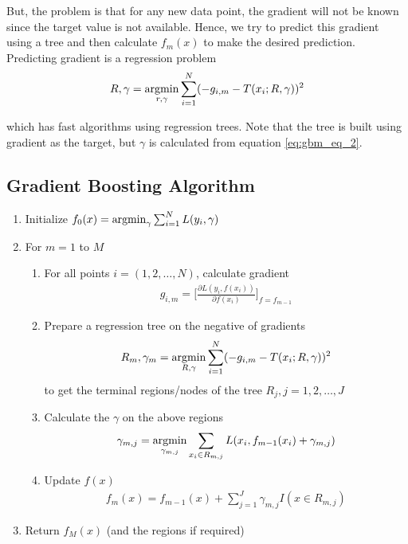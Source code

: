 \documentclass[../statistical_learning_notes.tex]{subfiles}
\begin{document}
But, the problem is that for any new data point, the gradient will not be known since the target value is not available. Hence, we try to predict this gradient using a tree and then calculate $f_{m}(x)$ to make the desired prediction. Predicting gradient is a regression problem
\begin{align*}
    R, \gamma = \operatorname*{argmin}_{r, \gamma} \sum_{i=1}^{N} (-g_{i,m} - T(x_{i}; R, \gamma))^{2}
\end{align*}

which has fast algorithms using regression trees. Note that the tree is built using gradient as the target, but $\gamma$ is calculated from equation \eqref{eq:gbm_eq_2}.


\subsection{Gradient Boosting Algorithm}
\begin{enumerate}
    \item Initialize $f_{0}(x) = \operatorname*{argmin}_{\gamma} \sum_{i=1}^{N} L(y_{i}, \gamma)$
    \item For $m=1$ to $M$
    \begin{enumerate}
        \item For all points $i = (1, 2, \ldots, N)$, calculate gradient
        \begin{align*}
            g_{i, m} = \bigg[ \frac{\partial L(y_{i}, f(x_{i}))}{\partial f(x_{i})} \bigg]_{f=f_{m-1}}
        \end{align*}
        \item Prepare a regression tree on the negative of gradients
        \begin{align*}
            R_{m}, \gamma_{m} = \operatorname*{argmin}_{R, \gamma} \sum_{i=1}^{N} (-g_{i,m} - T(x_{i}; R, \gamma))^{2}
        \end{align*}
        to get the terminal regions/nodes of the tree $R_{j}, j=1,2,\ldots,J$
        \item Calculate the $\gamma$ on the above regions
        \begin{align*}
            \gamma_{m,j} = \operatorname*{argmin}_{\gamma_{m,j}} \sum_{x_{i} \in R_{m,j}} L(x_{i}, f_{m-1}(x_{i}) + \gamma_{m,j})
        \end{align*}
        \item Update $f(x)$
        \begin{align*}
            f_{m}(x) = f_{m-1}(x) + \sum_{j=1}^{J} \gamma_{m,j} I(x \in R_{m,j})
        \end{align*}
    \end{enumerate}
    \item Return $f_{M}(x)$ (and the regions if required)
\end{enumerate}
\end{document}
